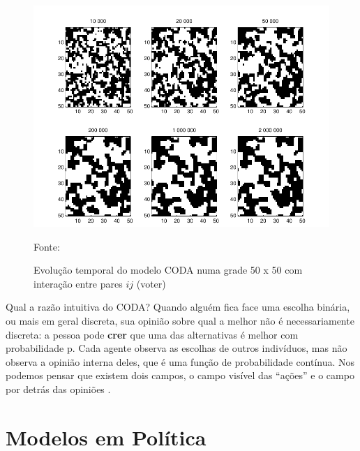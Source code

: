 \begin{figure}[H]
  \centering \includegraphics[scale = 0.7]{ims/andre.png}
  \caption{Evolução temporal do modelo CODA numa grade 50 x 50 com
    interação entre pares $ij$ (voter)}
  Fonte: 
\end{figure}


Qual a razão intuitiva do CODA?  Quando alguém fica face uma escolha
binária, ou mais em geral discreta, sua opinião sobre qual a melhor
não é necessariamente discreta: a pessoa pode \textbf{crer} que uma
das alternativas é melhor com probabilidade p. Cada agente observa as
escolhas de outros indivíduos, mas não observa a opinião interna
deles, que é uma função de probabilidade contínua. Nos podemos pensar
que existem dois campos, o campo visível das ``ações'' e o campo por
detrás das opiniões \cite{martins2008continuous}.


\section{Modelos em Política}

